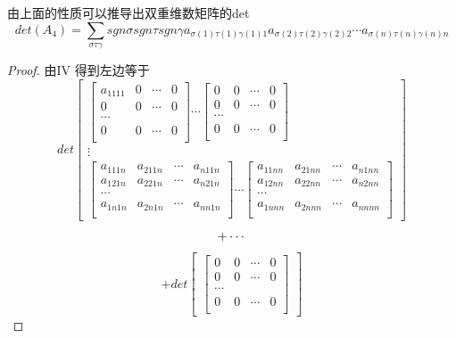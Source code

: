 \documentclass[twoside,a4paper,CCT]{cctart}   %
\begin{document}
\begin{theorem} 由上面的性质可以推导出双重维数矩阵的det
$$det(A_{4})=\sum \limits_{\sigma\tau\gamma}sgn\sigma sgn\tau sgn\gamma a_{\sigma(1)\tau(1)\gamma(1)1} a_{\sigma(2)\tau(2)\gamma(2)2}\cdots a_{\sigma(n)\tau(n)\gamma(n)n}$$
\end{theorem}
\begin{proof}
由$\textrm{IV}$ 得到左边等于
 \tiny \begin{equation}det\begin{bmatrix}
  \begin{bmatrix}
   a_{1111}& 0&\cdots&0\\
   0& 0&\cdots&0\\
 \cdots\\
0& 0&\cdots&0\\
\end{bmatrix}
\cdots
 \begin{bmatrix}
   0& 0&\cdots&0\\
   0& 0&\cdots&0\\
 \cdots\\
0& 0&\cdots&0\\
\end{bmatrix}\\
\vdots\\
\begin{bmatrix}
  a_{111n}& a_{211n}&\cdots&a_{n11n}\\
  a_{121n}& a_{221n}&\cdots&a_{n21n}\\
  \cdots\\
  a_{1n1n}& a_{2n1n}&\cdots&a_{nn1n}\\
  \end{bmatrix}
\cdots
\begin{bmatrix}
  a_{11nn}& a_{21nn}&\cdots&a_{n1nn}\\
  a_{12nn}& a_{22nn}&\cdots&a_{n2nn}\\
   \cdots\\
   a_{1nnn}& a_{2nnn}&\cdots&a_{nnnn}\\
\end{bmatrix}
\end{bmatrix}\end{equation}
$$+ \cdots\\$$
$$+
det\begin{bmatrix}
  \begin{bmatrix}
   0& 0&\cdots&0\\
   0& 0&\cdots&0\\
 \cdots\\
0& 0&\cdots&0\\

\end{bmatrix}
\end{bmatrix}$$
\end{proof}
\end{document}
